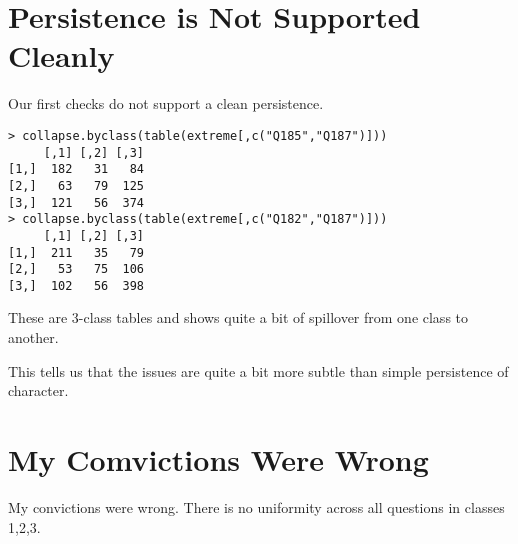\documentclass{amsart}
\begin{document}
\section{Persistence is Not Supported Cleanly}

Our first checks do not support a clean persistence.

\begin{verbatim}
> collapse.byclass(table(extreme[,c("Q185","Q187")]))
     [,1] [,2] [,3]
[1,]  182   31   84
[2,]   63   79  125
[3,]  121   56  374
> collapse.byclass(table(extreme[,c("Q182","Q187")]))
     [,1] [,2] [,3]
[1,]  211   35   79
[2,]   53   75  106
[3,]  102   56  398
\end{verbatim}                          
                          
                        These are 3-class tables and shows quite a bit of spillover from one class to another.
                    
                    This tells us that the issues are quite a bit more subtle than simple persistence of character.  
                    
\section{My Comvictions Were Wrong}

My convictions were wrong.  There is no uniformity across all questions in classes 1,2,3.  
                      
\end{document}
